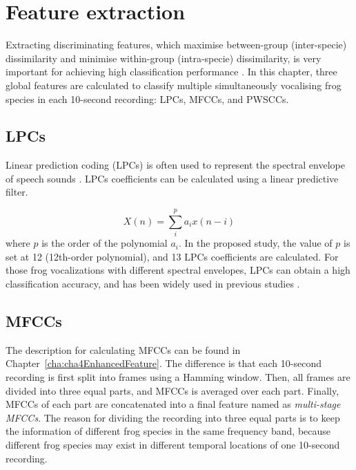 \section{Feature extraction}


Extracting discriminating features, which maximise between-group (inter-specie) dissimilarity
and minimise within-group (intra-specie) dissimilarity, is very important for achieving high classification performance \citep{huang2009frog, bedoya2014automatic}. In this chapter, three global features are calculated to classify multiple simultaneously vocalising frog species in each 10-second recording: LPCs, MFCCs, and PWSCCs. 





\subsection{LPCs}
Linear prediction coding (LPCs) is often used to represent the spectral envelope of speech sounds \citep{itakura1975line}. LPCs coefficients can be calculated using a linear predictive filter.

\begin{equation}
X(n) = \sum_{i}^{p}a_{i}x(n-i)
\end{equation}
where $p$ is the order of the polynomial $a_{i}$. In the proposed study, the value of $p$ is set at 12 (12th-order polynomial), and 13 LPCs coefficients are calculated. For those frog vocalizations with different spectral envelopes, LPCs can obtain a high classification accuracy, and has been widely used in previous studies \cite{yuan2012frog, jaafarcomparative, jaafar2015effect}.


\subsection{MFCCs}
The description for calculating MFCCs can be found in Chapter~\ref{cha:cha4EnhancedFeature}. The difference is that each 10-second recording is first split into frames using a Hamming window. Then, all frames are divided into three equal parts, and MFCCs is averaged over each part. Finally, MFCCs of each part are concatenated into a final feature named as \textit{multi-stage MFCCs}. The reason for dividing the recording into three equal parts is to keep the information of different frog species in the same frequency band, 
because different frog species may exist in different temporal locations of one 10-second recording. 


